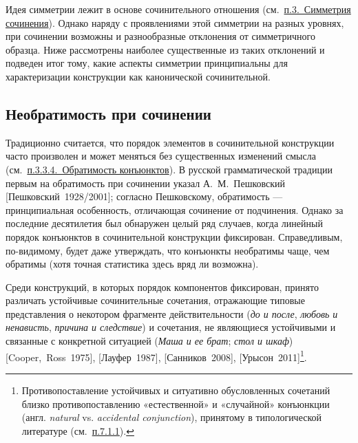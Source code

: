 Идея симметрии лежит в основе сочинительного отношения
(см.~\underline{п.3.~Симметрия сочинения}). Однако наряду с проявлениями
этой симметрии на разных уровнях, при сочинении возможны и разнообразные
отклонения от симметричного образца. Ниже рассмотрены наиболее
существенные из таких отклонений и подведен итог тому, какие аспекты
симметрии принципиальны для характеризации конструкции как канонической
сочинительной.

\subsection{Необратимость при
  сочинении}\label{ux43dux435ux43eux431ux440ux430ux442ux438ux43cux43eux441ux442ux44c-ux43fux440ux438-ux441ux43eux447ux438ux43dux435ux43dux438ux438}

Традиционно считается, что порядок элементов в сочинительной конструкции
часто произволен и может меняться без существенных изменений смысла
(см.~\underline{п.3.3.4.~Обратимость конъюнктов}). В русской
грамматической традиции первым на обратимость при сочинении указал
А.~М.~Пешковский {[}Пешковский~1928/2001{]}; согласно Пешковскому,
обратимость --- принципиальная особенность, отличающая сочинение от
подчинения. Однако за последние десятилетия был обнаружен целый ряд
случаев, когда линейный порядок конъюнктов в сочинительной конструкции
фиксирован. Справедливым, по-видимому, будет даже утверждать, что
конъюнкты необратимы чаще, чем обратимы (хотя точная статистика здесь
вряд ли возможна).

Среди конструкций, в которых порядок компонентов фиксирован, принято
различать устойчивые сочинительные сочетания, отражающие типовые
представления о некотором фрагменте действительности (\textit{до и после},
\textit{любовь и ненависть}, \textit{причина и следствие}) и сочетания, не
являющиеся устойчивыми и связанные с конкретной ситуацией (\textit{Маша и
  ее брат}; \textit{стол и шкаф}) {[}Cooper,~Ross~1975{]},
{[}Лауфер~1987{]}, {[}Санников~2008{]}, {[}Урысон~2011{]}\footnote{Противопоставление
  устойчивых и ситуативно обусловленных сочетаний близко
  противопоставлению «естественной» и «случайной» конъюнкции (англ.
  \textit{natural} vs. \textit{accidental conjunction}), принятому в
  типологической литературе (см.~\underline{п.7.1.1}).}.

